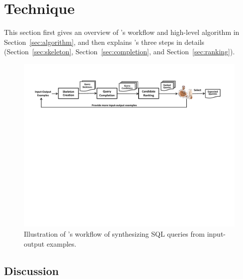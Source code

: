 
\section{Technique}
\label{sec:approach}

This section first gives an overview of \ourtool's
workflow and high-level algorithm in Section~\ref{sec:algorithm}, and
then explains \ourtool's three steps in details (Section~\ref{sec:skeleton},
Section~\ref{sec:completion}, and Section~\ref{sec:ranking}).



\begin{figure}[t]
  \centering
  \includegraphics[scale=0.70]{workflow}
  \vspace*{-2.0ex}\caption {{\label{fig:workflow} Illustration
  of \ourtool's workflow of synthesizing SQL queries from input-output examples. 
}}

\end{figure}













\subsection{Discussion}
\label{sec:uim}


